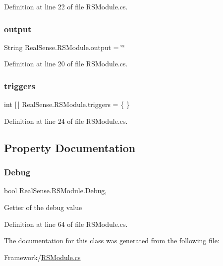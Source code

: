 Definition at line 22 of file R\+S\+Module.\+cs.

\mbox{\label{class_real_sense_1_1_r_s_module_a5f0ea0ffd2361fd2b792ed808a67f911}} 
\subsubsection{\texorpdfstring{output}{output}}
{\footnotesize\ttfamily String Real\+Sense.\+R\+S\+Module.\+output = \char`\"{}\char`\"{}}



Definition at line 20 of file R\+S\+Module.\+cs.

\mbox{\label{class_real_sense_1_1_r_s_module_a100988a1b957067db074dad8b4b9a078}} 
\subsubsection{\texorpdfstring{triggers}{triggers}}
{\footnotesize\ttfamily int \mbox{[}$\,$\mbox{]} Real\+Sense.\+R\+S\+Module.\+triggers = \{ \}}



Definition at line 24 of file R\+S\+Module.\+cs.



\subsection{Property Documentation}
\mbox{\label{class_real_sense_1_1_r_s_module_a89c9c568ab387b183a63ed2755a82203}} 
\subsubsection{\texorpdfstring{Debug}{Debug}}
{\footnotesize\ttfamily bool Real\+Sense.\+R\+S\+Module.\+Debug\hspace{0.3cm}{\ttfamily [get]}, {\ttfamily [set]}}

Getter of the debug value 

Definition at line 64 of file R\+S\+Module.\+cs.



The documentation for this class was generated from the following file\+:\begin{DoxyCompactItemize}
\item 
Framework/\hyperlink{_r_s_module_8cs}{R\+S\+Module.\+cs}\end{DoxyCompactItemize}
